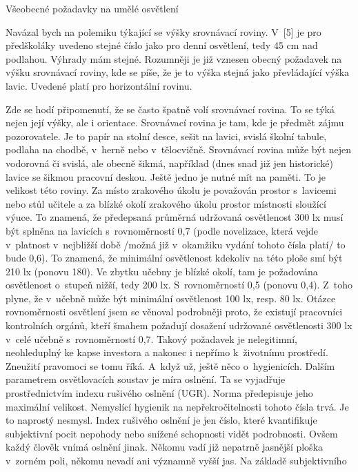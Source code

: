 \chap Všeobecné požadavky na umělé osvětlení

Navázal bych na polemiku týkající se výšky srovnávací roviny. V~[5] je pro předškoláky uvedeno stejné číslo
jako pro denní osvětlení, tedy 45 cm nad podlahou. Výhrady mám stejné. Rozumněji je již vznesen obecný
požadavek na výšku srovnávací roviny, kde se píše, že je to výška stejná jako převládající výška lavic.
Uvedené platí pro horizontální rovinu.

\medskip
Zde se hodí připomenutí, že se často špatně volí srovnávací rovina. To se týká nejen její výšky,
ale i orientace. Srovnávací rovina je tam, kde je předmět zájmu pozorovatele. Je to papír na stolní
desce, sešit na lavici, svislá školní tabule, podlaha na chodbě, v~herně nebo v~tělocvičně.
Srovnávací rovina může být nejen vodorovná či svislá, ale obecně šikmá, například (dnes snad již jen historické)
 lavice se šikmou pracovní deskou.
\medskip
Ještě jedno je nutné mít na paměti. To je velikost této roviny. Za místo zrakového úkolu je považován prostor
s~lavicemi nebo stůl učitele a za blízké okolí zrakového úkolu prostor místnosti sloužící výuce.
To znamená, že předepsaná průměrná udržovaná osvětlenost 300 lx musí být splněna na lavicích s~rovnoměrností 0,7
(podle novelizace, která vejde v~platnost v~nejbližší době /možná již v~okamžiku vydání tohoto čísla platí/ to bude 0,6).
 To znamená, že minimální osvětlenost kdekoliv na této ploše smí být 210 lx (ponovu 180).
 Ve zbytku učebny je blízké okolí, tam je požadována osvětlenost o~stupeň nižší, tedy 200 lx.
 S~rovnoměrností 0,5 (ponovu 0,4). Z~toho plyne, že v~učebně může být minimální osvětlenost 100 lx, resp. 80 lx.
 Otázce rovnoměrnosti osvětlení jsem se věnoval podrobněji proto, že existují pracovníci kontrolních orgánů,
 kteří šmahem požadují dosažení udržované osvětlenosti 300 lx v~celé učebně s~rovnoměrností 0,7.
 Takový požadavek je nelegitimní, neohleduplný ke kapse investora a nakonec i nepřímo k~životnímu prostředí.
 Zneužití pravomoci se tomu říká.
\medskip
A~když už, ještě něco o~hygienicích. Dalším parametrem osvětlovacích soustav je míra oslnění.
Ta se vyjadřuje prostřednictvím indexu rušivého oslnění (UGR). Norma předepisuje jeho maximální velikost.
Nemyslící hygienik na nepřekročitelnosti tohoto čísla trvá. Je to naprostý nesmysl.
Index rušivého oslnění je jen číslo, které kvantifikuje subjektivní pocit nepohody nebo snížené
schopnosti vidět podrobnosti. Ovšem každý člověk vnímá oslnění jinak. Někomu vadí již nepatrně
jasnější ploška v~zorném poli, někomu nevadí ani významně vyšší jas. Na základě subjektivního

